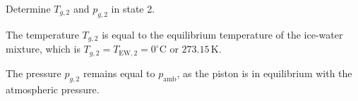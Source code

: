 Determine \( T_{g,2} \) and \( p_{g,2} \) in state 2.  

The temperature \( T_{g,2} \) is equal to the equilibrium temperature of the ice-water mixture, which is \( T_{g,2} = T_{\text{EW},2} = 0^\circ\text{C} \) or \( 273.15 \, \text{K} \).  

The pressure \( p_{g,2} \) remains equal to \( p_{\text{amb}} \), as the piston is in equilibrium with the atmospheric pressure.